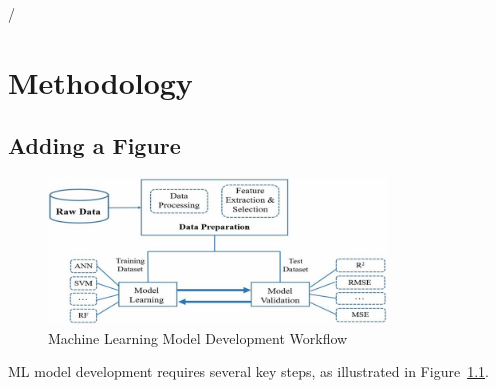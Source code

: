 /\chapter{Methodology}

\section{Adding a Figure}


\begin{figure}[H]
    \centering
    \includegraphics[width=0.8\textwidth]{Figures/Fig:ML-workflow.png}
    \caption{Machine Learning Model Development Workflow}
    \label{fig:ml-workflow}
\end{figure}





ML model development requires several key steps, as illustrated in Figure~\ref{fig:ml-workflow}.